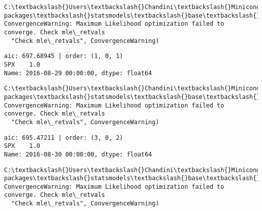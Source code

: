 \documentclass[11pt]{article}
\begin{document}
    \begin{Verbatim}[commandchars=\\\{\}]
C:\textbackslash{}Users\textbackslash{}Chandini\textbackslash{}Miniconda3\textbackslash{}envs\textbackslash{}auquan\textbackslash{}lib\textbackslash{}site-packages\textbackslash{}statsmodels\textbackslash{}base\textbackslash{}model.py:496: ConvergenceWarning: Maximum Likelihood optimization failed to converge. Check mle\_retvals
  "Check mle\_retvals", ConvergenceWarning)

    \end{Verbatim}

    \begin{Verbatim}[commandchars=\\\{\}]
aic: 697.68945 | order: (1, 0, 1)
SPX    1.0
Name: 2016-08-29 00:00:00, dtype: float64

    \end{Verbatim}

    \begin{Verbatim}[commandchars=\\\{\}]
C:\textbackslash{}Users\textbackslash{}Chandini\textbackslash{}Miniconda3\textbackslash{}envs\textbackslash{}auquan\textbackslash{}lib\textbackslash{}site-packages\textbackslash{}statsmodels\textbackslash{}base\textbackslash{}model.py:496: ConvergenceWarning: Maximum Likelihood optimization failed to converge. Check mle\_retvals
  "Check mle\_retvals", ConvergenceWarning)

    \end{Verbatim}

    \begin{Verbatim}[commandchars=\\\{\}]
aic: 695.47211 | order: (3, 0, 2)
SPX    1.0
Name: 2016-08-30 00:00:00, dtype: float64

    \end{Verbatim}

    \begin{Verbatim}[commandchars=\\\{\}]
C:\textbackslash{}Users\textbackslash{}Chandini\textbackslash{}Miniconda3\textbackslash{}envs\textbackslash{}auquan\textbackslash{}lib\textbackslash{}site-packages\textbackslash{}statsmodels\textbackslash{}base\textbackslash{}model.py:496: ConvergenceWarning: Maximum Likelihood optimization failed to converge. Check mle\_retvals
  "Check mle\_retvals", ConvergenceWarning)

    \end{Verbatim}
\end{document}

